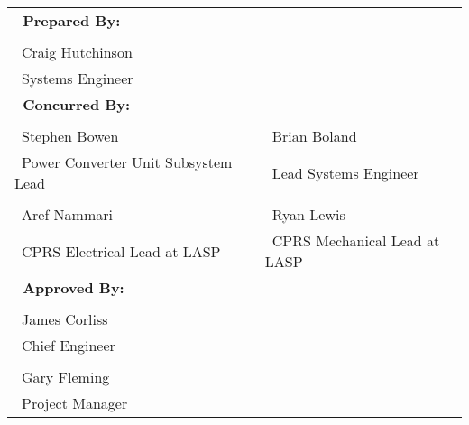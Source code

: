 \bfseries
\sffamily
{}
\vspace{0.1in}
\raggedright
\normalfont
\begin{table}[htbp]
\begin{minipage}{\linewidth}
\centering
\small
\begin{tabulary}{\textwidth}{p{3.325in}p{0.225in}p{2.5in}}
\bfseries{~Prepared By:} & & \\[0.35in]
 \\
\cmidrule(l){1-1}%
~Craig Hutchinson\\
~Systems Engineer\\[0.25in]
\bfseries{~Concurred By:} & & \\[0.35in]
 \\
\cmidrule(l){1-1}\cmidrule(l){3-3}
~Stephen Bowen & & ~Brian Boland \\
~Power Converter Unit Subsystem Lead & & ~Lead Systems Engineer \\[0.35in]
 \\
\cmidrule(l){1-1}\cmidrule(l){3-3}
~Aref Nammari & & ~Ryan Lewis \\
~CPRS Electrical Lead at LASP & & ~CPRS Mechanical Lead at LASP \\[0.35in]
\bfseries{~Approved By:} & & \\[0.35in]
 \\
\cmidrule(l){1-1}%
~James Corliss & &  \\
~Chief Engineer & &  \\[0.35in]
 \\
\cmidrule(l){1-1}%
~Gary Fleming & &  \\
~Project Manager & &  \\[0.35in]
\end{tabulary}
\end{minipage}
\end{table}
\clearpage